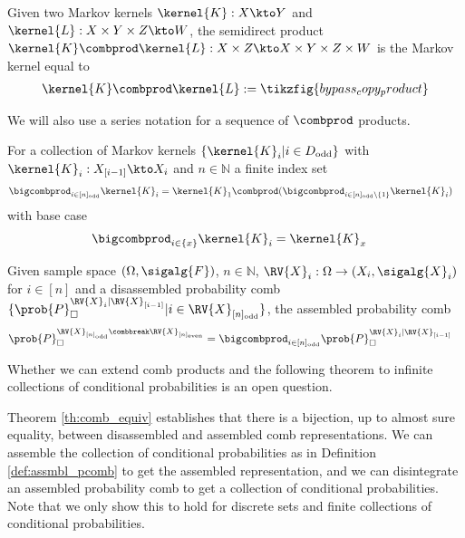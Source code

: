 \begin{definition}
Given two Markov kernels $\kernel{K}:X\kto Y$ and $\kernel{L}:X\times Y\times Z\kto W$, the semidirect product $\kernel{K}\combprod \kernel{L}:X\times Z\kto X\times Y\times Z\times W$ is the Markov kernel equal to
\begin{align}
    \kernel{K}\combprod \kernel{L} := \tikzfig{bypass_copy_product}
\end{align}
\end{definition}

We will also use a series notation for a sequence of $\combprod$ products.

\begin{definition}
For a collection of Markov kernels $\{\kernel{K}_i|i\in D_{\text{odd}}\}$ with $\kernel{K}_i:X_{[i-1]}\kto X_i$ and $n\in\mathbb{N}$ a finite index set
\begin{align}
    \bigcombprod_{i\in [n]_{\text{odd}}} \kernel{K}_i &= \kernel{K}_1 \combprod (\bigcombprod_{i\in [n]_{\text{odd}}\setminus\{1\}} \kernel{K}_i)
\end{align}
with base case
\begin{align}
    \bigcombprod_{i\in \{x\}} \kernel{K}_i &= \kernel{K}_x
\end{align}
\end{definition}

\begin{definition}\label{def:assmbl_pcomb}
Given sample space $(\Omega,\sigalg{F})$, $n\in \mathbb{N}$, $\RV{X}_{i}:\Omega\to (X_i,\sigalg{X}_i)$ for $i\in [n]$ and a disassembled probability comb $\{\prob{P}_\square^{\RV{X}_{i}|\RV{X}_{[i-1]}}|i\in \RV{X}_{[n]_{\text{odd}}}\}$, the assembled probability comb
\begin{align}
    \prob{P}_\square^{\RV{X}_{[n]_{\text{odd}}}\combbreak \RV{X}_{[n]_{\text{even}}}} &= \bigcombprod_{i\in [n]_{\text{odd}}}\prob{P}_\square^{\RV{X}_{i}|\RV{X}_{[i-1]}}
\end{align}
\end{definition}

Whether we can extend comb products and the following theorem to infinite collections of conditional probabilities is an open question.

Theorem \ref{th:comb_equiv} establishes that there is a bijection, up to almost sure equality, between disassembled and assembled comb representations. We can assemble the collection of conditional probabilities as in Definition \ref{def:assmbl_pcomb} to get the assembled representation, and we can disintegrate an assembled probability comb to get a collection of conditional probabilities. Note that we only show this to hold for discrete sets and finite collections of conditional probabilities.

